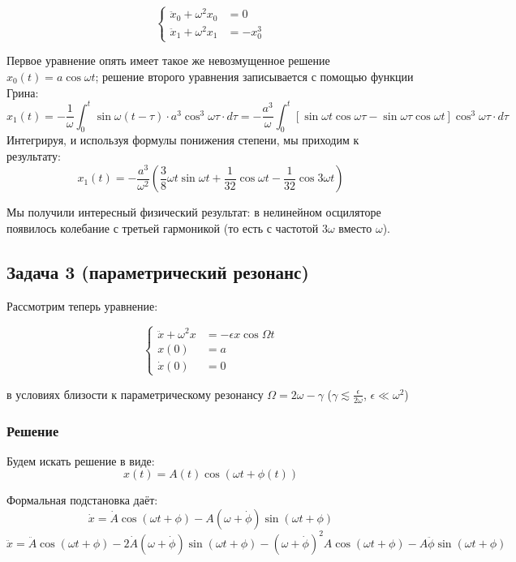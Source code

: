 \documentclass[a4paper,12pt]{article}
\begin{document}
\[
\begin{cases}
\ddot{x}_{0}+\omega^{2}x_{0} & =0\\
\ddot{x}_{1}+\omega^{2}x_{1} & =-x_{0}^{3}
\end{cases}
\]

 \noindent
Первое уравнение опять имеет такое же невозмущенное решение $x_{0}(t)=a\cos\omega t$;
решение второго уравнения записывается с помощью функции Грина:
\[
x_{1}\left(t\right)=-\frac{1}{\omega}\int_{0}^{t}\sin\omega(t-\tau)\cdot a^{3}\cos^{3}\omega\tau\cdot d\tau=-\frac{a^{3}}{\omega}\int_{0}^{t}[\sin\omega t\cos\omega\tau-\sin\omega\tau\cos\omega t]\cos^{3}\omega\tau\cdot d\tau
\]
Интегрируя, и используя формулы понижения степени, мы приходим к результату:
\[
x_{1}(t)=-\frac{a^{3}}{\omega^{2}}\left(\frac{3}{8}\omega t\sin\omega t+\frac{1}{32}\cos\omega t-\frac{1}{32}\cos3\omega t\right)
\]

 \noindent
Мы получили интересный физический результат: в нелинейном осциляторе
появилось колебание с третьей гармоникой (то есть с частотой $3\omega$
вместо $\omega$).


\subsection*{Задача 3 (параметрический резонанс)}

Рассмотрим теперь уравнение:

\[
\begin{cases}
\ddot{x}+\omega^{2}x & =-\epsilon x\cos\Omega t\\
x(0) & =a\\
\dot{x}(0) & =0
\end{cases}
\]

 \noindent
в условиях близости к параметрическому резонансу $\Omega=2\omega-\gamma$
($\gamma\lesssim\frac{\epsilon}{2\omega}$, $\epsilon\ll\omega^{2}$)


\subsubsection*{Решение}

Будем искать решение в виде:
\[
x(t)=A(t)\cos(\omega t+\phi(t))
\]

 \noindent
Формальная подстановка даёт:
\[
\dot{x}=\dot{A}\cos(\omega t+\phi)-A(\omega+\dot{\phi})\sin\left(\omega t+\phi\right)
\]
\[
\ddot{x}=\ddot{A}\cos(\omega t+\phi)-2\dot{A}(\omega+\dot{\phi})\sin(\omega t+\phi)-(\omega+\dot{\phi})^{2}A\cos(\omega t+\phi)-A\ddot{\phi}\sin(\omega t+\phi)
\]
\end{document}
